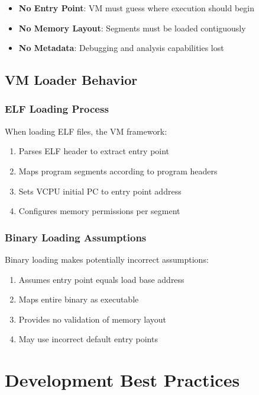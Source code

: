 \documentclass[11pt,a4paper]{article}
\begin{document}
\begin{itemize}
\item \textbf{No Entry Point}: VM must guess where execution should begin
\item \textbf{No Memory Layout}: Segments must be loaded contiguously
\item \textbf{No Metadata}: Debugging and analysis capabilities lost
\end{itemize}

\subsection{VM Loader Behavior}

\subsubsection{ELF Loading Process}

When loading ELF files, the VM framework:

\begin{enumerate}
\item Parses ELF header to extract entry point
\item Maps program segments according to program headers
\item Sets VCPU initial PC to entry point address
\item Configures memory permissions per segment
\end{enumerate}

\subsubsection{Binary Loading Assumptions}

Binary loading makes potentially incorrect assumptions:

\begin{enumerate}
\item Assumes entry point equals load base address
\item Maps entire binary as executable
\item Provides no validation of memory layout
\item May use incorrect default entry points
\end{enumerate}

\section{Development Best Practices}
\end{document}
